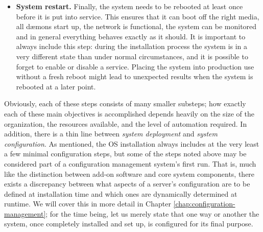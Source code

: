 \begin{itemize}
	\item {\bf System restart.}
		Finally, the system needs to be rebooted at least once
		before it is put into service.  This ensures that it can
		boot off the right media, all d\ae mons start up, the
		network is functional, the system can be monitored and in
		general everything behaves exactly as it should.  It is
		important to always include this step: during the
		installation process the system is in a very different
		state than under normal circumstances, and it is possible
		to forget to enable or disable a service.  Placing the
		system into production use without a fresh reboot might
		lead to unexpected results when the system is rebooted at
		a later point.
\end{itemize}

Obviously, each of these steps consists of many
smaller substeps; how exactly each of these main
objectives is accomplished depends heavily on the size
of the organization, the resources available, and the
level of automation required.  In addition, there is a
thin line between {\em system deployment} and {\em system configuration}.  As
mentioned, the OS installation always includes at the
very least a few minimal configuration steps, but some
of the steps noted above may be considered part of a
configuration management system's first run.  That is,
much like the distinction between add-on software and
core system components, there exists a discrepancy
between what aspects of a server's configuration are
to be defined at installation time and which ones are
dynamically determined at runtime.  We will cover this
in more detail in Chapter
\ref{chap:configuration-management}; for the time
being, let us merely state that one way or another the
system, once completely installed and set up, is
configured for its final purpose.

